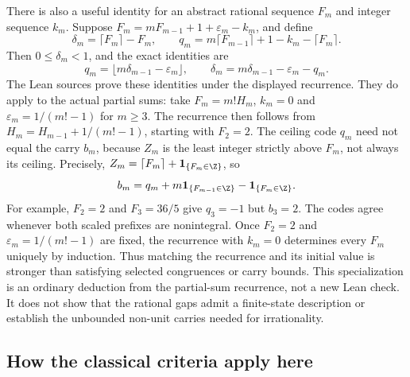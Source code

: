There is also a useful identity for an abstract rational sequence $F_m$
and integer sequence $k_m$. Suppose
$F_m=mF_{m-1}+1+\varepsilon_m-k_m$, and define
\[
 \delta_m=\lceil F_m\rceil-F_m,\qquad
 q_m=m\lceil F_{m-1}\rceil+1-k_m-\lceil F_m\rceil.
\]
Then $0\le\delta_m<1$, and the exact identities are
\[
 q_m=\lfloor m\delta_{m-1}-\varepsilon_m\rfloor,\qquad
 \delta_m=m\delta_{m-1}-\varepsilon_m-q_m.
\]
The Lean sources prove these identities under the displayed
recurrence. They do apply to the actual partial sums: take $F_m=m!H_m$,
$k_m=0$ and $\varepsilon_m=1/(m!-1)$ for $m\ge3$. The recurrence then
follows from $H_m=H_{m-1}+1/(m!-1)$, starting with $F_2=2$.
The ceiling code $q_m$ need not equal the carry $b_m$, because $Z_m$ is
the least integer strictly above $F_m$, not always its ceiling. Precisely,
$Z_m=\lceil F_m\rceil+\mathbf1_{\{F_m\in\Z\}}$, so
\[
 b_m=q_m+m\mathbf1_{\{F_{m-1}\in\Z\}}
          -\mathbf1_{\{F_m\in\Z\}}.
\]
For example, $F_2=2$ and $F_3=36/5$ give $q_3=-1$ but $b_3=2$.
The codes agree whenever both scaled prefixes are nonintegral. Once
$F_2=2$ and $\varepsilon_m=1/(m!-1)$ are fixed, the recurrence with $k_m=0$
determines every $F_m$ uniquely by induction. Thus matching the recurrence
and its initial value is stronger than satisfying selected congruences
or carry bounds. This specialization is an ordinary deduction from the
partial-sum recurrence, not a new Lean check. It does not show that the rational gaps admit a
finite-state description or establish the unbounded non-unit carries
needed for irrationality.

\subsection{How the classical criteria apply here}\label{long68:sec:ext-literature}


